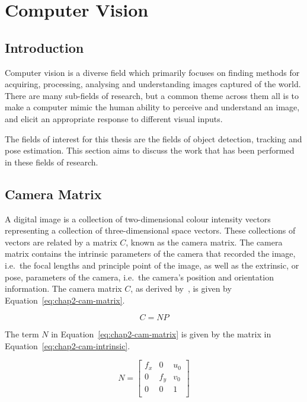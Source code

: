 \section{Computer Vision}

\subsection{Introduction}

Computer vision is a diverse field which primarily focuses on finding methods for acquiring, processing, analysing and understanding images captured of the world. There are many sub-fields of research, but a common theme across them all is to make a computer mimic the human ability to perceive and understand an image, and elicit an appropriate response to different visual inputs. 

The fields of interest for this thesis are the fields of object detection, tracking and pose estimation. This section aims to discuss the work that has been performed in these fields of research.  

\subsection{Camera Matrix}

A digital image is a collection of two-dimensional colour intensity vectors representing a collection of three-dimensional space vectors. These collections of vectors are related by a matrix $C$, known as the camera matrix. The camera matrix contains the intrinsic parameters of the camera that recorded the image, i.e.\ the focal lengths and principle point of the image, as well as the extrinsic, or pose, parameters of the camera, i.e.\ the camera's position and orientation information. The camera matrix $C$, as derived by~\cite{heikkila1997four}, is given by Equation~\ref{eq:chap2-cam-matrix}.

\begin{equation}
  \label{eq:chap2-cam-matrix}
  C = 
  NP
\end{equation}

The term $N$ in Equation~\ref{eq:chap2-cam-matrix} is given by the matrix in Equation~\ref{eq:chap2-cam-intrinsic}.

\begin{equation}
  \label{eq:chap2-cam-intrinsic}
  N = 
  \begin{bmatrix}
    f_x & 0   & u_0 \\
    0   & f_y & v_0 \\
    0   & 0   & 1   \\
  \end{bmatrix}
\end{equation}

